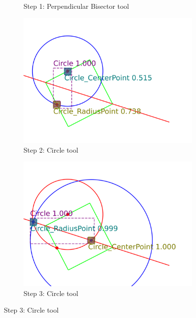 \begin{figure}[!htb]
\begin{subfigure}[t]{0.32\textwidth}
         \caption{Step 1: Perpendicular Bisector tool}
         \label{fig:Epsilon12_example_step1}
     \end{subfigure}
     \hfill
     \begin{subfigure}[t]{0.32\textwidth}
         \centering
         \includegraphics[width=\textwidth]{img/Delta-10_example/output_image1.png}
         \caption{Step 2: Circle tool}
         \label{fig:Epsilon12_example_step2}
     \end{subfigure}
     \hfill
     \begin{subfigure}[t]{0.32\textwidth}
         \centering
         \includegraphics[width=\textwidth]{img/Delta-10_example/output_image2.png}
         \caption{Step 3: Circle tool}
         \label{fig:Epsilon12_example_step3}

\end{subfigure}
\end{figure}
